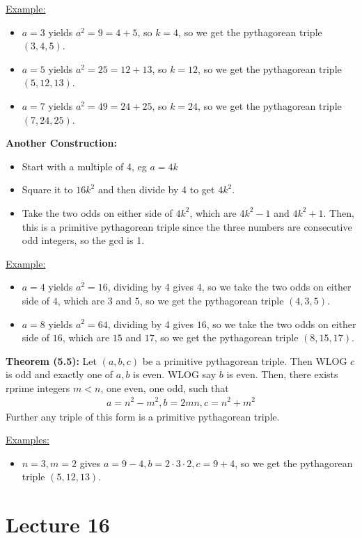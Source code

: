 \documentclass{article}
\begin{document}
\underline{Example:} \begin{itemize}
    \item $a=3$ yields $a^2=9=4+5$, so $k=4$, so we get the pythagorean triple $(3,4,5)$.
    \item $a=5$ yields $a^2=25=12+13$, so $k=12$, so we get the pythagorean triple $(5,12,13)$.
    \item $a=7$ yields $a^2=49=24+25$, so $k=24$, so we get the pythagorean triple $(7,24,25)$.
\end{itemize}

\textbf{Another Construction:} \begin{itemize}
    \item Start with a multiple of 4, eg $a=4k$
    \item Square it to $16k^2$ and then divide by 4 to get $4k^2$.
    \item Take the two odds on either side of $4k^2$, which are $4k^2-1$ and $4k^2+1$. Then, this is a primitive pythagorean triple since the three numbers are consecutive odd integers, so the gcd is 1.
\end{itemize}

\underline{Example:} \begin{itemize}
    \item $a=4$ yields $a^2=16$, dividing by 4 gives $4$, so we take the two odds on either side of $4$, which are $3$ and $5$, so we get the pythagorean triple $(4,3,5)$.
    \item $a=8$ yields $a^2=64$, dividing by 4 gives $16$, so we take the two odds on either side of $16$, which are $15$ and $17$, so we get the pythagorean triple $(8,15,17)$.
\end{itemize}

\textbf{Theorem (5.5):} Let $(a,b,c)$ be a primitive pythagorean triple. Then WLOG $c$ is odd and exactly one of $a,b$ is even. WLOG say $b$ is even. Then, there exists rprime integers $m<n$, one even, one odd, such that \begin{align*}
    a=n^2-m^2, b=2mn, c=n^2+m^2
\end{align*}Further any triple of this form is a primitive pythagorean triple.

\underline{Examples:} \begin{itemize}
    \item $n=3, m=2$ gives $a=9-4, b=2\cdot 3\cdot 2, c=9+4$, so we get the pythagorean triple $(5,12,13)$.
\end{itemize}

\section{Lecture 16}
\end{document}
